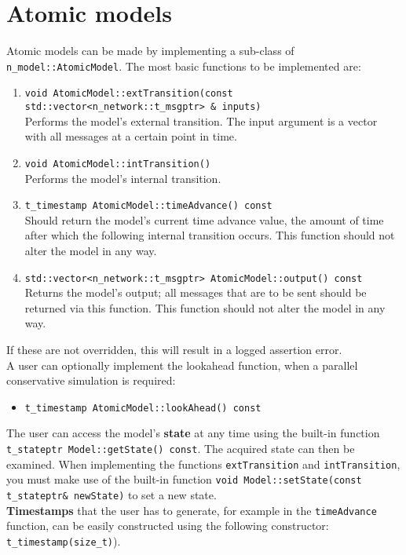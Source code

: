 \section{Atomic models}
Atomic models can be made by implementing a sub-class of \texttt{n\_model::AtomicModel}. The most basic functions to be implemented are:
\begin{enumerate}
	\item \texttt{void AtomicModel::extTransition(const std::vector{\textless}n\_network::t\_msgptr{\textgreater} \& inputs)}\\
		Performs the model's external transition. The input argument is a vector with all messages at a certain point in time.
	\item \texttt{void AtomicModel::intTransition()}\\
		Performs the model's internal transition. 
	\item \texttt{t\_timestamp AtomicModel::timeAdvance() const}\\
		Should return the model's current time advance value, the amount of time after which the following internal transition occurs. This function should not alter the model in any way.
	\item \texttt{std::vector{\textless}n\_network::t\_msgptr{\textgreater} AtomicModel::output()  const}\\
		Returns the model's output; all messages that are to be sent should be returned via this function. This function should not alter the model in any way.
\end{enumerate}
If these are not overridden, this will result in a logged assertion error.\\
A user can optionally implement the lookahead function, when a parallel conservative simulation is required:
\begin{itemize}
	\item \texttt{t\_timestamp AtomicModel::lookAhead() const}
\end{itemize}

The user can access the model's \textbf{state} at any time using the built-in function \texttt{t\_stateptr Model::getState() const}. The acquired state can then be examined. When implementing the functions \texttt{extTransition} and \texttt{intTransition}, you must make use of the built-in function \texttt{void Model::setState(const t\_stateptr\& newState)} to set a new state.\\

\textbf{Timestamps} that the user has to generate, for example in the \texttt{timeAdvance} function, can be easily constructed using the following constructor:\\ \texttt{t\_timestamp(size\_t)}).\\

